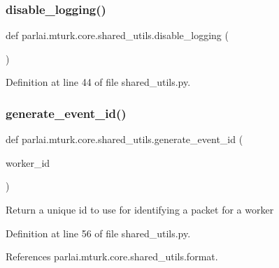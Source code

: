 \subsubsection{\texorpdfstring{disable\+\_\+logging()}{disable\_logging()}}
{\footnotesize\ttfamily def parlai.\+mturk.\+core.\+shared\+\_\+utils.\+disable\+\_\+logging (\begin{DoxyParamCaption}{ }\end{DoxyParamCaption})}



Definition at line 44 of file shared\+\_\+utils.\+py.

\mbox{\label{namespaceparlai_1_1mturk_1_1core_1_1shared__utils_aba2e4d48063dafc80e931f8925dbb755}} 
\subsubsection{\texorpdfstring{generate\+\_\+event\+\_\+id()}{generate\_event\_id()}}
{\footnotesize\ttfamily def parlai.\+mturk.\+core.\+shared\+\_\+utils.\+generate\+\_\+event\+\_\+id (\begin{DoxyParamCaption}\item[{}]{worker\+\_\+id }\end{DoxyParamCaption})}

\begin{DoxyVerb}Return a unique id to use for identifying a packet for a worker\end{DoxyVerb}
 

Definition at line 56 of file shared\+\_\+utils.\+py.



References parlai.\+mturk.\+core.\+shared\+\_\+utils.\+format.

\mbox{\label{namespaceparlai_1_1mturk_1_1core_1_1shared__utils_ac4e340ccc66c691fdd294c734dae0c5d}} 
